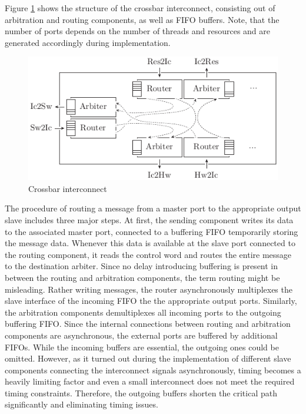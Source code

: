 Figure \ref{fig:crossbar} shows the structure of the crossbar interconnect,
consisting out of arbitration and routing components, as well as \ac{FIFO}
buffers. Note, that the number of ports depends on the number of threads and
resources and are generated accordingly during implementation.
\begin{figure}[tb]
	\centering
	\includegraphics{../figures/crossbar}
	\caption{Crossbar interconnect}
	\label{fig:crossbar}
\end{figure}
The procedure of routing a message from a master port to the appropriate
output slave includes three major steps. At first, the sending component
writes its data to the associated master port, connected to a buffering
\ac{FIFO} temporarily storing the message data. Whenever this data is
available at the slave port connected to the routing component, it reads the
control word and routes the entire message to the destination arbiter. Since
no delay introducing buffering is present in between the routing and
arbitration components, the term routing might be misleading. Rather writing
messages, the router asynchronously multiplexes the slave interface of the
incoming \ac{FIFO} the the appropriate output ports. Similarly, the
arbitration components demultiplexes all incoming ports to the outgoing
buffering \ac{FIFO}. Since the internal connections between routing and
arbitration components are asynchronous, the external ports are buffered by
additional \acp{FIFO}. While the incoming buffers are essential, the outgoing
ones could be omitted. However, as it turned out during the implementation of
different slave components connecting the interconnect signals asynchronously,
timing becomes a heavily limiting factor and even a small interconnect does
not meet the required timing constraints. Therefore, the outgoing buffers
shorten the critical path significantly and eliminating timing issues.

